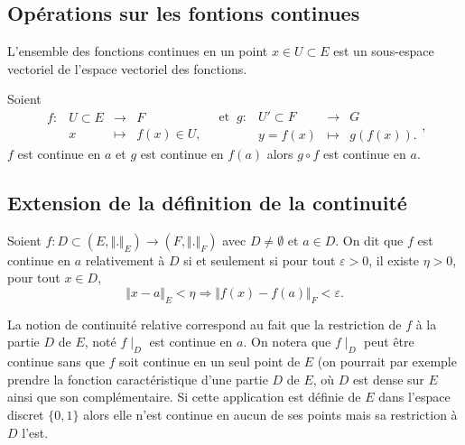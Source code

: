 \documentclass[class=report,crop=false]{standalone}
\begin{document}
\subsection{Opérations sur les fontions continues}

 \begin{proposition}
\textcolor[rgb]{0.50,0.00,0.25}{
L'ensemble des fonctions continues en un point $x \in U \subset E$ est un sous-espace vectoriel de l'espace vectoriel des fonctions.
}
\end{proposition}

 \begin{proposition}
\textcolor[rgb]{0.50,0.00,0.25}{
Soient 
\begin{equation*}
\begin{array}{llll}
f:& U \subset E & \rightarrow & F \\
  & x & \mapsto &  f(x) \in U,
\end{array} \;\;
\begin{array}{llll}
\mathrm{et} \;\; g:& U' \subset F & \rightarrow & G \\
  & y=f(x) & \mapsto &  g(f(x)).
\end{array},
\end{equation*}
$f$ est continue en $a$ et $g$ est continue en $f(a)$ alors $g \circ f$ est continue en $a$.
}
\end{proposition}


\subsection{Extension de la définition de la continuité}


\begin{definition} 
\textcolor[rgb]{0.73,0.00,0.00}{
\noindent Soient $f: D \subset (E, \Vert . \Vert_E) \rightarrow (F, \Vert . \Vert_F)$ avec $D \neq \emptyset$ et $a \in D$. On dit que $f$ est continue en $a$
relativement à $D$ si et seulement si  pour tout $\varepsilon >0$, il existe $\eta >0$, pour tout $x \in D$, 
\begin{equation*}
\Vert x-a \Vert_E < \eta \Longrightarrow \Vert f(x) - f(a) \Vert_F < \varepsilon.
\end{equation*}
}
\end{definition}


\begin{remarque*}
\textcolor[rgb]{0.00,0.00,1.00}{
La notion de continuité relative correspond au fait que la restriction de $f$ à la partie $D$ de $E$, noté $f\mid_D$ est continue en $a$. On notera que $f\mid_D$ peut être continue sans que $f$ soit continue en un seul point de $E$ (on pourrait par exemple prendre la fonction caractéristique d'une partie $D$ de $E$, où $D$ est dense sur $E$ ainsi que son complémentaire. Si cette application est définie de $E$ dans l'espace discret $\lbrace 0,1\rbrace$ alors elle n'est continue en aucun de ses points mais sa restriction à $D$ l'est.}
\end{remarque*}
\end{document}
